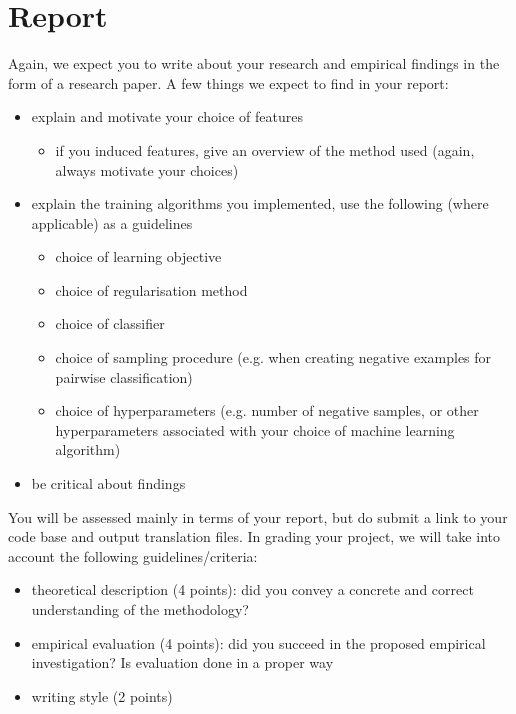 \section{Report}

Again, we expect you to write about your research and empirical findings in the form of a research paper.
A few things we expect to find in your report:

\begin{itemize}
    \item explain and motivate your choice of features
    \begin{itemize}
        \item if you induced features, give an overview of the method used (again, always motivate your choices)
    \end{itemize}
    \item explain the training algorithms you implemented, use the following (where applicable) as a guidelines
    \begin{itemize}
        \item choice of learning objective
        \item choice of regularisation method
        \item choice of classifier
        \item choice of sampling procedure (e.g. when creating negative examples for pairwise classification)
        \item choice of hyperparameters (e.g. number of negative samples, or other hyperparameters associated with your choice of machine learning algorithm)
    \end{itemize}
    \item be critical about findings
\end{itemize}

You will be assessed mainly in terms of your report, but do submit a link to your code base and output translation files.
In grading your project, we will take into account the following guidelines/criteria:

\begin{itemize}
    \item theoretical description (4 points): did you convey a concrete and correct understanding of the methodology?
    \item empirical evaluation (4 points): did you succeed in the proposed empirical investigation? Is evaluation done in a proper way
    \item writing style (2 points)
\end{itemize}

